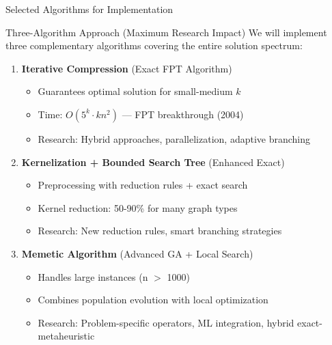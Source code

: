 \documentclass[aspectratio=169]{beamer}
\begin{document}
\begin{frame}{Selected Algorithms for Implementation}
	\begin{block}{Three-Algorithm Approach (Maximum Research Impact)}
		We will implement three complementary algorithms covering the entire solution spectrum:
	\end{block}

	\vspace{0.3cm}

	\begin{enumerate}
		\item \textbf{Iterative Compression} (Exact FPT Algorithm)
		      \begin{itemize}
			      \footnotesize
			      \item Guarantees optimal solution for small-medium $k$
			      \item Time: $O(5^k \cdot kn^2)$ --- FPT breakthrough (2004)
			      \item Research: Hybrid approaches, parallelization, adaptive branching
		      \end{itemize}

		      \vspace{0.2cm}

		\item \textbf{Kernelization + Bounded Search Tree} (Enhanced Exact)
		      \begin{itemize}
			      \footnotesize
			      \item Preprocessing with reduction rules + exact search
			      \item Kernel reduction: 50-90\% for many graph types
			      \item Research: New reduction rules, smart branching strategies
		      \end{itemize}

		      \vspace{0.2cm}

		\item \textbf{Memetic Algorithm} (Advanced GA + Local Search)
		      \begin{itemize}
			      \footnotesize
			      \item Handles large instances (n $>$ 1000)
			      \item Combines population evolution with local optimization
			      \item Research: Problem-specific operators, ML integration, hybrid exact-metaheuristic
		      \end{itemize}
	\end{enumerate}
\end{frame}
\end{document}
